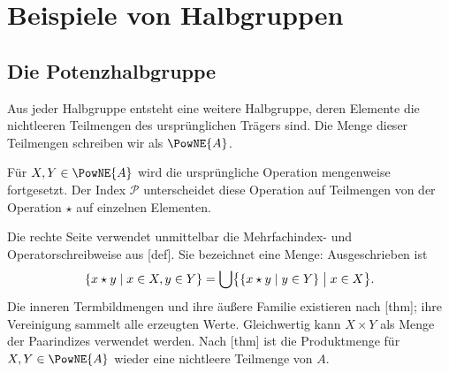 \documentclass[main.tex]{subfiles}
\begin{document}


\section{Beispiele von Halbgruppen}

\subsection{Die Potenzhalbgruppe}
\hypertarget{power.main}{}

Aus jeder Halbgruppe entsteht eine weitere Halbgruppe, deren Elemente die
nichtleeren Teilmengen des ursprünglichen Trägers sind. Die Menge dieser
Teilmengen schreiben wir als \(\PowNE{A}\).

Für \(X,Y\in\PowNE{A}\) wird die ursprüngliche Operation mengenweise
fortgesetzt. Der Index \(\mathcal P\) unterscheidet diese Operation auf
Teilmengen von der Operation \(\star\) auf einzelnen Elementen.

\hypertarget{proofpartnr.28.2.4.2.18}{}

Die rechte Seite verwendet unmittelbar die Mehrfachindex- und
Operatorschreibweise aus [def].
Sie bezeichnet eine Menge: Ausgeschrieben ist
\[
 \{x\star y\mid x\in X,y\in Y\}
 =\bigcup\bigl\{\{x\star y\mid y\in Y\}\bigm|x\in X\bigr\}.
\]
Die inneren Termbildmengen und ihre äußere Familie existieren nach
[thm]; ihre Vereinigung
sammelt alle erzeugten Werte. Gleichwertig kann \(X\times Y\)
als Menge der Paarindizes verwendet werden.
Nach [thm] ist die
Produktmenge für \(X,Y\in\PowNE{A}\) wieder eine nichtleere Teilmenge von \(A\).

\hypertarget{proofpartnr.28.2.4.2.6}{}
\end{document}
